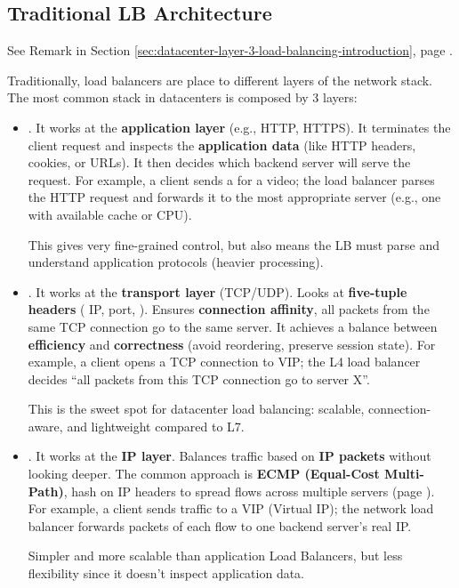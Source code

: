 \subsection{Traditional LB Architecture}

\begin{remarkbox}
    See Remark in Section \ref{sec:datacenter-layer-3-load-balancing-introduction}, page \pageref{rmk:osi-model}.
\end{remarkbox}

\noindent
Traditionally, load balancers are place to different layers of the network stack. The most common stack in datacenters is composed by 3 layers:
\begin{itemize}
    \item {}. It works at the \textbf{application layer} (e.g., HTTP, HTTPS). It terminates the client request and inspects the \textbf{application data} (like HTTP headers, cookies, or URLs). It then decides which backend server will serve the request. For example, a client sends a  for a  video; the load balancer parses the HTTP request and forwards it to the most appropriate server (e.g., one with available cache or CPU).

    This gives very fine-grained control, but also means the LB must parse and understand application protocols (heavier processing).

    
    \item {}. It works at the \textbf{transport layer} (TCP/UDP). Looks at \textbf{five-tuple headers} ( IP,  port, ). Ensures \textbf{connection affinity}, all packets from the same TCP connection go to the same server. It achieves a balance between \textbf{efficiency} and \textbf{correctness} (avoid reordering, preserve session state). For example, a client opens a TCP connection to VIP; the L4 load balancer decides ``all packets from this TCP connection go to server X''.
    
    This is the sweet spot for datacenter load balancing: scalable, connection-aware, and lightweight compared to L7.
    
    
    \item {}. It works at the \textbf{IP layer}. Balances traffic based on \textbf{IP packets} without looking deeper. The common approach is \textbf{ECMP (Equal-Cost Multi-Path)}, hash on IP headers to spread flows across multiple servers (page \pageref{subsection: Equal Cost Multi Path (ECMP)}). For example, a client sends traffic to a VIP (Virtual IP); the network load balancer forwards packets of each flow to one backend server's real IP.
    
    Simpler and more scalable than application Load Balancers, but less flexibility since it doesn't inspect application data.
\end{itemize}
